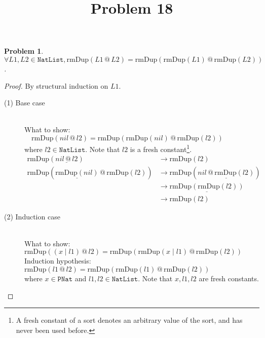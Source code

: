 \documentclass[12pt, a4paper]{article}
\title{Problem 18}
\date{\vspace{-5ex}}
\newtheorem{problem}{Problem}
\newcommand{\rel}[1]{\mathrel{#1}}
\newcommand{\rmx}[1]{\mathrm{#1}}
\newcommand{\larrow}{\longrightarrow}
\newcommand{\under}{\underline}
\begin{document}
\maketitle

\begin{problem}
$\forall L1, L2 \in \mathtt{NatList}, \rmx{rmDup}(L1 \rel{@} L2) = \rmx{rmDup}(\rmx{rmDup}(L1) \rel{@} \rmx{rmDup}(L2))$.
\end{problem}
\begin{proof}
By structural induction on $L1$.
\begin{description}
\item[(1) Base case]~\\
\noindent
What to show: $\quad \rmx{rmDup}(nil \rel{@} l2) = \rmx{rmDup}(\rmx{rmDup}(nil) \rel{@} \rmx{rmDup}(l2))$\\
where $l2 \in \mathtt{NatList}$. Note that $l2$ is a fresh constant\footnote{A fresh constant of a sort denotes an arbitrary value of the sort, and has never been used before.}.
\begin{align*}
\rmx{rmDup}(\under{nil \rel{@} l2})
	&\larrow \rmx{rmDup}(l2) \tag{by @1} \\
\rmx{rmDup}(\under{\rmx{rmDup}(nil)} \rel{@} \rmx{rmDup}(l2))
	&\larrow \rmx{rmDup}(\under{nil \rel{@} \rmx{rmDup}(l2)}) \tag{by rmDup1} \\
	&\larrow \under{\rmx{rmDup}(\rmx{rmDup}(l2))} \tag{by @1} \\
	&\larrow \rmx{rmDup}(l2) \tag{by Problem 17}
\end{align*}

\item[(2) Induction case]~\\
What to show: $\rmx{rmDup}((x \mid l1) \rel{@} l2) = \rmx{rmDup}(\rmx{rmDup}(x \mid l1) \rel{@} \rmx{rmDup}(l2))$\\
Induction hypothesis: $\rmx{rmDup}(l1 \rel{@} l2) = \rmx{rmDup}(\rmx{rmDup}(l1) \rel{@} \rmx{rmDup}(l2))$  \\
where $x \in \mathtt{PNat}$ and $l1, l2 \in \mathtt{NatList}$.
Note that $x, l1, l2$ are fresh constants.


\end{description}
\end{proof}
\end{document}
